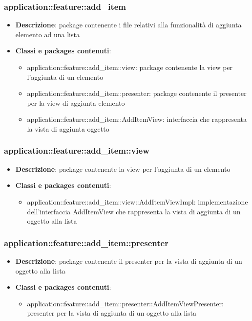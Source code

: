 \subsubsection{application::feature::add\_item}
\begin{itemize}
	\item \textbf{Descrizione}: package contenente i file relativi alla funzionalità di aggiunta elemento ad una lista
	\item \textbf{Classi e packages contenuti}:
	\begin{itemize}
	\item application::feature::add\_item::view: package contenente la view per l'aggiunta di un elemento
	\item application::feature::add\_item::presenter: package contenente il presenter per la view di aggiunta elemento
	\item application::feature::add\_item::AddItemView: interfaccia che rappresenta la vista di aggiunta oggetto
	\end{itemize}
\end{itemize}

\subsubsection{application::feature::add\_item::view}
\begin{itemize}
	\item \textbf{Descrizione}: package contenente la view per l'aggiunta di un elemento
	\item \textbf{Classi e packages contenuti}:
	\begin{itemize}
	\item application::feature::add\_item::view::AddItemViewImpl: implementazione dell'interfaccia AddItemView che rappresenta la vista di aggiunta di un oggetto alla lista
	\end{itemize}
\end{itemize}

\subsubsection{application::feature::add\_item::presenter}
\begin{itemize}
	\item \textbf{Descrizione}: package contenente il presenter per la vista di aggiunta di un oggetto alla lista
	\item \textbf{Classi e packages contenuti}:
	\begin{itemize}
	\item application::feature::add\_item::presenter::AddItemViewPresenter: presenter per la vista di aggiunta di un oggetto alla lista
	\end{itemize}
\end{itemize}

